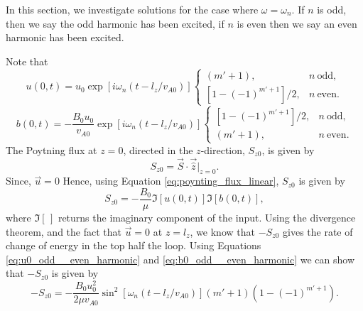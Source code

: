 In this section, we investigate solutions for the case where $\omega=\omega_n$. If $n$ is odd, then we say the odd harmonic has been excited, if $n$ is even then we say an even harmonic has been excited. 

Note that
\begin{equation}
    \label{eq:u0_odd__even_harmonic}
    u(0,t) = u_0 \exp[i\omega_n(t - l_z/v_{A0})]\begin{cases}
   (m'+1), & n\ \text{odd}, \\
   [1-(-1)^{m'+1}]/2, & n\ \text{even}.
    \end{cases}
\end{equation}
\begin{equation}
    \label{eq:b0_odd__even_harmonic}
    b(0,t) = -\frac{B_0u_0}{v_{A0}} \exp[i\omega_n(t - l_z/v_{A0})]\begin{cases}
   [1-(-1)^{m'+1}]/2, & n\ \text{odd}, \\
   (m'+1), & n\ \text{even}.
    \end{cases}
\end{equation}
The Poytning flux at $z=0$, directed in the $z$-direction, $S_{z0}$, is given by
\begin{equation}
    S_{z0} = \vec{S}\cdot\vec{\hat{z}}|_{z=0}.
\end{equation}
Since, $\vec{u}=0$
Hence, using  Equation \eqref{eq:poynting_flux_linear}, $S_{z0}$ is given by
\begin{equation}
    S_{z0} = -\frac{B_0}{\mu}\Im[u(0,t)]\Im[b(0,t)],
\end{equation}
where $\Im[\,]$ returns the imaginary component of the input. Using the divergence theorem, and the fact that $\vec{u}=0$ at $z=l_z$, we know that $-S_{z0}$ gives the rate of change of energy in the top half the loop. Using Equations \eqref{eq:u0_odd__even_harmonic} and \eqref{eq:b0_odd__even_harmonic} we can show that $-S_{z0}$ is given by
\begin{equation}
    -S_{z0}=-\frac{B_0u_0^2}{2\mu v_{A0}}\sin^2[\omega_n(t - l_z/v_{A0})](m'+1)(1-(-1)^{m'+1}).
\end{equation}

